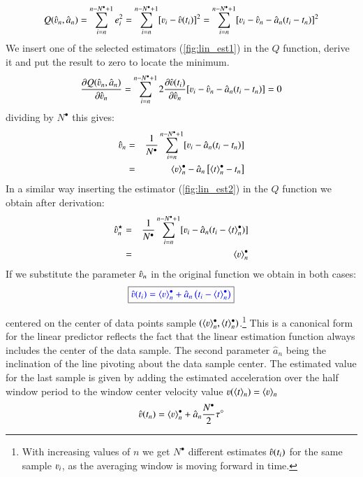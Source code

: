 \begin{equation}
Q(\hat{\varv}_n, \hat{a}_n) =\sum\limits_{i=n}^{n-N^\bullet+1} e_i^2=\sum\limits_{i=n}^{n-N^\bullet+1}[ \varv_i-\hat{\varv}(t_i)]^2  =\sum\limits_{i=n}^{n-N^\bullet+1}[\varv_i-\hat{\varv}_n-\hat{a}_n(t_i-t_n)]^2
\end{equation}
We insert one of the selected estimators (\ref{fig:lin_est1}) in the $Q$ function, derive it and put the result to zero to locate the minimum.
\begin{equation}
\frac{\partial Q(\hat{\varv}_n, \hat{a}_n)}{\partial\hat{\varv}_n}=\sum\limits_{i=n}^{n-N^\bullet+1} 2\frac{\partial\hat{\varv}(t_i)}{\partial\hat{\varv}_n}[\varv_i-\hat{\varv}_n-\hat{a}_n(t_i-t_n)]=0
\end{equation}
dividing by $N^\bullet$ this gives:
\begin{eqnarray}
\hat{\varv}_n &=& \frac{1}{N^\bullet} \sum\limits_{i=n}^{n-N^\bullet+1} [\varv_i-\hat{a}_n(t_i-t_n)]\nonumber\\
&=& \langle \varv \rangle^\bullet_n-\hat{a}_n\left [\langle t\rangle^\bullet_n - t_n\right ]
\end{eqnarray}
In a similar way inserting the estimator (\ref{fig:lin_est2}) in the $Q$ function we obtain after derivation:
\begin{eqnarray}
\hat{\varv}^{\star}_n &=& \frac{1}{N^\bullet} \sum\limits_{i=n}^{n-N^\bullet+1} [\varv_i-\hat{a}_n(t_i-\langle t\rangle^\bullet _n)]\nonumber\\
&=& \langle \varv \rangle^\bullet_n
\end{eqnarray}
If we substitute the parameter $ \hat{\varv}_n $ in the original function we obtain in both cases:
\begin{equation}
\boxed{\color{blue}
\hat{\varv}(t_i) =\langle \varv \rangle^\bullet_n + \hat{a}_n\left(t_i-\langle t \rangle^\bullet_n\right)
}
\label{eq:lincan}
\end{equation}

centered on the center of data points sample $(\langle \varv \rangle^\bullet_n,\langle t \rangle^\bullet_n)$.\footnote{With increasing values of $n$ we get $N^\bullet$ different estimates $\hat{\varv}(t_i)$  for the same sample $\varv_i$, as the averaging window is moving forward in time.}
This is a 
{canonical form} for the linear predictor reflects the fact that the linear estimation function always includes
{the center} of the data sample. The second parameter $\hat{a}_n$ being the inclination of the line pivoting about the data sample center. 
The estimated value for the last sample is given by adding the estimated acceleration over the half window period to the window center velocity value $\varv(\langle t\rangle_n)=\langle \varv\rangle_n $
\begin{equation}
\hat{\varv}(t_n) =\langle \varv \rangle^\bullet_n + \hat{a}_n\frac{N^\bullet}{2} \tau^\circ
\end{equation}

